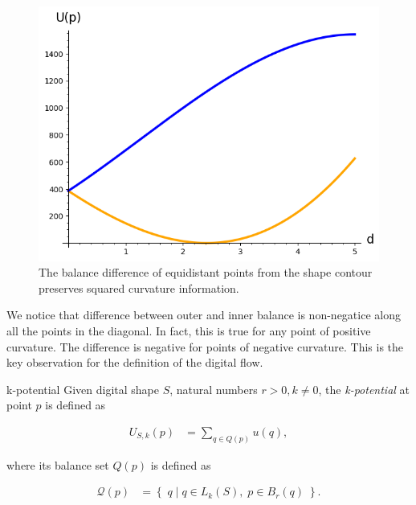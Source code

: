 \begin{figure}[h!]
\begin{minipage}{0.25\textwidth}
\end{minipage}%
\begin{minipage}{0.75\textwidth}
\includegraphics[scale=0.75]{figures/appendix-potential-elastica/potential-elastica-plot.png}
\end{minipage}
\caption{The balance difference of equidistant points from the shape contour preserves squared curvature information.}
\label{fig:balance-plot}
\end{figure}


We notice that difference between outer and inner balance is non-negatice along all the points in the diagonal. In fact, this is true for any point of positive curvature. The difference is negative for points of negative curvature. This is the key observation for the definition of the digital flow.

\begin{definition}{k-potential}
Given digital shape $S$, natural numbers $r>0, k \neq 0$, the \emph{k-potential} at point $p$ is defined as

\begin{align*}
	U_{S,k}(p) &= \sum_{q \in Q(p)}{ u(q),}
\end{align*}

where its balance set $Q(p)$ is defined as

\begin{align*}
	\mathcal{Q}(p) &= \left\{\; q \; | \; q \in L_k(S),\; p \in B_r(q) \; \right\}.
\end{align*}

\end{definition}

